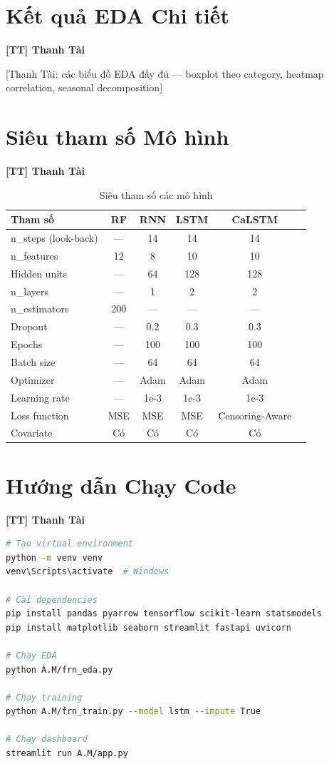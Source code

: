\documentclass[12pt,a4paper]{report}
\newcommand{\ownerTT}{\colorbox{red!15}{\textbf{[TT] Thanh Tài}}}
\begin{document}
\appendix

\chapter{Kết quả EDA Chi tiết}
\ownerTT

[Thanh Tài: các biểu đồ EDA đầy đủ --- boxplot theo category, heatmap correlation, seasonal decomposition]

\chapter{Siêu tham số Mô hình}
\ownerTT

\begin{table}[H]
\centering
\caption{Siêu tham số các mô hình}
\begin{tabular}{lccccc}
\toprule
\textbf{Tham số} & \textbf{RF} & \textbf{RNN} & \textbf{LSTM} & \textbf{CaLSTM} \\
\midrule
n\_steps (look-back) & ---  & 14   & 14    & 14   \\
n\_features          & 12   & 8    & 10    & 10   \\
Hidden units         & ---  & 64   & 128   & 128  \\
n\_layers            & ---  & 1    & 2     & 2    \\
n\_estimators        & 200  & ---  & ---   & ---  \\
Dropout              & ---  & 0.2  & 0.3   & 0.3  \\
Epochs               & ---  & 100  & 100   & 100  \\
Batch size           & ---  & 64   & 64    & 64   \\
Optimizer            & ---  & Adam & Adam  & Adam \\
Learning rate        & ---  & 1e-3 & 1e-3  & 1e-3 \\
Loss function        & MSE  & MSE  & MSE   & Censoring-Aware \\
Covariate            & Có   & Có   & Có    & Có   \\
\bottomrule
\end{tabular}
\end{table}

\chapter{Hướng dẫn Chạy Code}
\ownerTT

\begin{lstlisting}[caption=Cài đặt môi trường, language=bash]
# Tạo virtual environment
python -m venv venv
venv\Scripts\activate  # Windows

# Cài dependencies
pip install pandas pyarrow tensorflow scikit-learn statsmodels
pip install matplotlib seaborn streamlit fastapi uvicorn

# Chạy EDA
python A.M/frn_eda.py

# Chạy training
python A.M/frn_train.py --model lstm --impute True

# Chạy dashboard
streamlit run A.M/app.py
\end{lstlisting}
\end{document}
